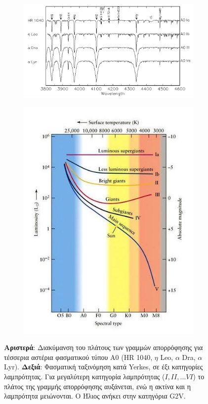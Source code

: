 \begin{figure}[h]
   \centering
\begin{subfigure}[h]{0.42\textwidth}
	\centering
   	 \includegraphics[angle=270,origin=c,scale=0.3]{Figures/luminosity_variations_yerkes.png} 
\end{subfigure}
\begin{subfigure}[h]{0.55\textwidth}
	\centering
	\includegraphics[scale=0.6]{Figures/spectral_classes_yerkes.jpg} 
    \end{subfigure}
    \caption{\textbf{Αριστερά}: Διακύμανση του πλάτους των γραμμών απορρόφησης για τέσσερια αστέρια φασματικού τύπου Α0 (HR 1040, $\eta$ Leo, $\alpha$ Dra, $\alpha$ Lyr). \textbf{Δεξιά}: Φασματική ταξινόμηση κατά Yerkes, σε έξι κατηγορίες λαμπρότητας. Για μεγαλύτερη κατηγορία λαμπρότητας ($ I, II, \dots VI$) το πλάτος της γραμμής απορρόφησης αυξάνεται, ενώ η ακτίνα και η λαμπρότητα μειώνονται. Ο Ήλιος ανήκει στην κατηγόρια G2V.}
    \label{fig:spectral_classes_yerkes}
\end{figure}

